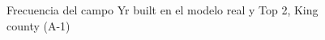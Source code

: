 \begin{figure}[H]
    \centering
    
    \caption{Frecuencia del campo Yr built en el modelo real y Top 2, King county (A-1)}
    \label{frecuency-top2-yr built}
\end{figure}